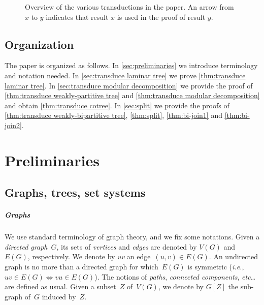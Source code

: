 \documentclass{lmcs} %
\newcommand*\defd[2][\em\color{red!25!black}]{{#1#2}}
\newcommand{\node}{\ensuremath{\mathsf{node}}\xspace}
\newcommand{\etc}{\emph{etc\ldots}\xspace}
\def\ie{{\em i.e.}}
\begin{document}
\begin{figure}
    \caption{%
        Overview of the various transductions in the paper. An arrow from $x$ to $y$ indicates that result $x$ is used in the proof of result $y$.
    }%
    \label{fig:overview}
\end{figure}
\bigbreak

\subsection{Organization}
The paper is organized as follows. In \autoref{sec:preliminaries} we introduce terminology and notation needed. In \autoref{sec:transduce laminar tree} we prove \autoref{thm:transduce laminar tree}. In \autoref{sec:transduce modular decomposition} we provide the proof of \autoref{thm:transduce weakly-partitive tree} and \autoref{thm:transduce modular decomposition} and obtain \autoref{thm:transduce cotree}. In \autoref{sec:split} we provide the proofs of \autoref{thm:transduce weakly-bipartitive tree}, \autoref{thm:split}, \autoref{thm:bi-join1} and \autoref{thm:bi-join2}.

\section{Preliminaries}\label{sec:preliminaries}
\subsection{Graphs, trees, set systems}
\subparagraph{Graphs}
We use standard terminology of graph theory,
and we fix some notations.
Given a \emph{directed graph}~$G$,
its sets of \emph{vertices} and \emph{edges}
are denoted by \defd{$V(G)$} and \defd{$E(G)$}, respectively.
We denote by \defd{uv} an edge~$(u,v)\in E(G)$.
An undirected graph is no more than a directed graph
for which~$E(G)$ is symmetric (\ie, $uv\in E(G)\iff vu\in E(G)$).
The notions of \emph{paths}, \emph{connected components}, \etc are defined as usual.
Given a subset~$Z$ of~$V(G)$,
we denote by \defd{$G[Z]$} the sub-graph of~$G$ induced by~$Z$.
\end{document}
